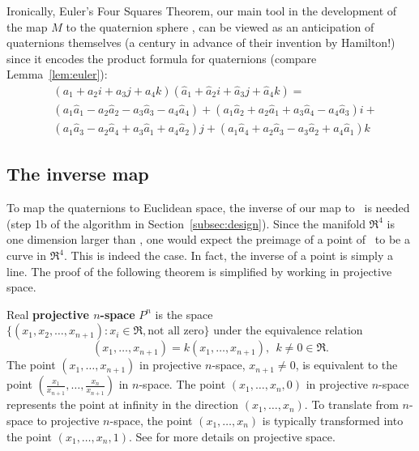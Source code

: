 \begin{rmk}
Ironically, Euler's Four Squares Theorem, our main tool
in the development of the map $M$ to the quaternion sphere , 
can be viewed as an anticipation
of quaternions themselves (a century in advance of their invention by Hamilton!)
since it encodes the product formula for quaternions 
(compare Lemma~\ref{lem:euler}):
\[
\begin{array}{ll}
& (a_1 + a_2 i + a_3 j + a_4 k) 
(\hat{a}_1 + \hat{a}_2 i + \hat{a}_3 j + \hat{a}_4 k) = \\
& (a_1 \hat{a}_1 - a_2\hat{a}_2 - a_3\hat{a}_3 - a_4\hat{a}_4) +
   (a_1\hat{a}_2 + a_2\hat{a}_1 + a_3\hat{a}_4 - a_4\hat{a}_3) i + \\
&  (a_1\hat{a}_3 - a_2\hat{a}_4 + a_3\hat{a}_1 + a_4\hat{a}_2) j +
   (a_1\hat{a}_4 + a_2\hat{a}_3 - a_3\hat{a}_2 + a_4\hat{a}_1) k
\end{array}
\]
\end{rmk}

\subsection{The inverse map}

To map the quaternions to Euclidean space,
the inverse of our map to \ is needed (step 1b of the algorithm
in Section~\ref{subsec:design}).
Since the manifold $\Re^4$ is one dimension larger than , 
one would expect the preimage of a point of \ to be 
a curve in $\Re^4$.
This is indeed the case.
In fact, the inverse of a point is simply a line.
The proof of the following theorem is simplified by working in projective space.
%
\begin{defn2}
\label{defn:projspace}
Real {\bf projective $n$-space} $P^n$ is the space 
$\{ (x_1,x_2,\ldots,x_{n+1}) : x_i \in \Re, \mbox{not all zero} \}$
under the equivalence relation 
\begin{equation}
\label{eq:projequivalence}
(x_1,\ldots,x_{n+1}) = k(x_1,\ldots,x_{n+1}),\ \ k \neq 0 \in \Re.
\end{equation}
The point $(x_1,\ldots,x_{n+1})$ in projective $n$-space, $x_{n+1} \neq 0$,
is equivalent to the point $(\frac{x_1}{x_{n+1}},\ldots,\frac{x_n}{x_{n+1}})$
in $n$-space.
The point $(x_1,\ldots,x_n,0)$ in projective $n$-space represents the point
at infinity in the direction $(x_1,\ldots,x_n)$.
To translate from $n$-space to projective $n$-space, the point 
$(x_1,\ldots,x_n)$ is typically transformed into the point $(x_1,\ldots,x_n,1)$.
See \cite{harris92} for more details on projective space.
\end{defn2}

